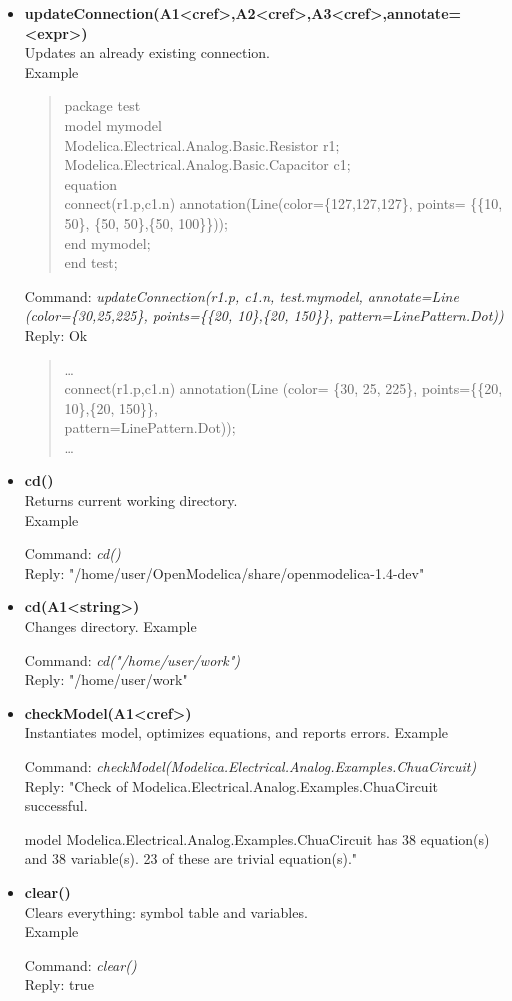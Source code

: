 \documentclass[11pt,a4paper,oneside,english]{book}
\newenvironment{modelicaExamples}{\begin{itemize}}{\end{itemize}}
\newcommand{\api}[2]{\item \textbf{#1} \\ #2}
\newcommand{\tab}{\hspace{2em}}
\newcommand{\command}[1]{Command: \textit{#1}\\}
\newcommand{\reply}[1]{Reply: #1}
\newcommand{\functionex}[2]{\begin{singlespace} \command{#1} \reply{#2} \end{singlespace}}
\newcommand{\examples}{Example}
\newenvironment{mocode}{\begin{verse}\begin{singlespace}\begin{scriptsize}\ttfamily}{\end{scriptsize}\end{singlespace}\end{verse}}
\begin{document}
\begin{modelicaExamples}
		\api{updateConnection(A1<cref>,A2<cref>,A3<cref>,annotate=<expr>)}{Updates an already existing connection.\\
		\examples
		\begin{mocode}
		package test\\
		\tab model mymodel\\
		\tab\tab Modelica.Electrical.Analog.Basic.Resistor r1;\\
		\tab\tab Modelica.Electrical.Analog.Basic.Capacitor c1;\\
		\tab equation \\
		\tab\tab connect(r1.p,c1.n) annotation(Line(color=\{127,127,127\}, po\-ints= \{\{10, 50\}, \{50, 50\},\{50, 100\}\}));\\
		\tab end mymodel;\\
		end test;\\
		\end{mocode}
		\functionex{updateConnection(r1.p, c1.n, test.mymodel, annotate=Line (co\-lor=\{30,25,225\}, points=\{\{20, 10\},\{20, 150\}\}, pattern=LinePattern.Dot))}
		{Ok}
		
		\begin{mocode}
		\dots \\
		connect(r1.p,c1.n) annotation(Line (color= \{30, 25, 225\}, po\-ints=\{\{20, 10\},\{20, 150\}\},\\ pattern=LinePattern.Dot));\\
		\dots
		\end{mocode}
		
		}
		
		\api{cd()}{Returns current working directory.\\
		\examples
		\functionex{cd()}
		{"/home/user/OpenModelica/share/openmodelica-1.4-dev"}
		}
		
		\api{cd(A1<string>)}{Changes directory.
		\examples
		\functionex{cd("/home/user/work")}
		{"/home/user/work"}
		}
		
		\api{checkModel(A1<cref>)}{Instantiates model, optimizes equations, and reports errors.
		\examples
		\functionex{checkModel(Modelica.Electrical.Analog.Examples.ChuaCircuit)}
		{"Check of Modelica.Electrical.Analog.Examples.ChuaCircuit successful.
		
		model Modelica.Electrical.Analog.Examples.ChuaCircuit has 38 equation(s) and 38 variable(s). 23 of these are trivial equation(s)."}
		}
		
		\api{clear()}{Clears everything: symbol table and variables.\\
		\examples
		\functionex{clear()}
		{true}
		}
		

\end{modelicaExamples}
\end{document}
